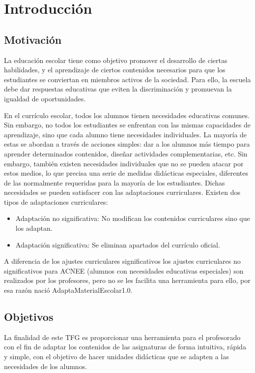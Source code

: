 \chapter{Introducción}
\label{cap:introduccion}

\section{Motivación}
La educación escolar tiene como objetivo promover el desarrollo de ciertas habilidades, y el aprendizaje de ciertos contenidos necesarios para que los estudiantes se conviertan en miembros activos de la sociedad. Para ello, la escuela debe dar respuestas educativas que eviten la discriminación y promuevan la igualdad de oportunidades.

En el currículo escolar, todos los alumnos tienen necesidades educativas comunes. Sin embargo, no todos los estudiantes se enfrentan con las mismas capacidades de aprendizaje, sino que cada alumno tiene necesidades individuales. La mayoría de estas se abordan a través de acciones simples: dar a los alumnos más tiempo para aprender determinados contenidos, diseñar actividades complementarias, etc.  Sin embargo, también existen necesidades individuales que no se pueden atacar por estos medios, lo que precisa una serie de medidas didácticas especiales, diferentes de las normalmente requeridas para la mayoría de los estudiantes. Dichas necesidades se pueden satisfacer con las adaptaciones curriculares. Existen dos tipos de adaptaciones curriculares: 
\begin{itemize}
    \item Adaptación no significativa: No modifican los contenidos curriculares sino que los adaptan.
    \item Adaptación significativa: Se eliminan apartados del currículo oficial.
\end{itemize}
A diferencia de los ajustes curriculares significativos los ajustes curriculares no significativos para ACNEE (alumnos con necesidades educativas especiales) son realizados por los profesores, pero no se les facilita una herramienta para ello, por esa razón nació AdaptaMaterialEscolar1.0.

\section{Objetivos}
La finalidad de este TFG es proporcionar una herramienta para el profesorado con el fin de adaptar los contenidos de las asignaturas de forma intuitiva, rápida y simple, con el objetivo de hacer unidades didácticas que se adapten a las necesidades de los alumnos.

